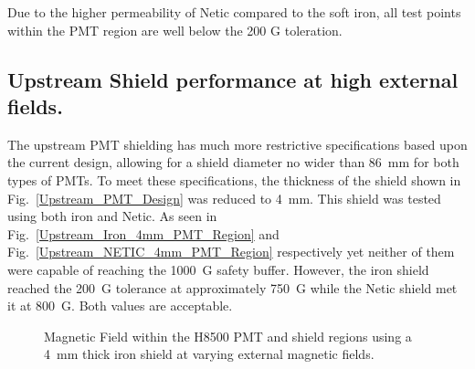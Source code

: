 \documentclass[12pt]{article}
\begin{document}
Due to the higher permeability of Netic compared to the soft iron, all test points 
within the PMT region are well below the 200 G toleration.


\subsection{Upstream Shield performance at high external  fields.}
The upstream PMT shielding has much more restrictive specifications based 
upon the current design, allowing for a shield diameter no wider than 86~mm for both types of PMTs.
To meet these specifications, the thickness of the shield shown in Fig.~\ref{Upstream_PMT_Design} 
was reduced to 4~mm.
This shield was tested using both iron and Netic. 
As seen in Fig.~\ref{Upstream_Iron_4mm_PMT_Region}  and Fig.~\ref{Upstream_NETIC_4mm_PMT_Region} 
respectively yet neither of them  were capable of reaching the 1000~G safety buffer. 
However, the iron shield reached the 200~G tolerance at approximately 
750~G while the Netic shield met it at 800~G. Both values are acceptable.
%
\begin{figure}[ht]
\centering
{}
\qquad
{}
\caption{\small{Magnetic Field within the H8500 PMT and shield regions using a 4~mm thick iron shield at varying external magnetic fields.}}\label{Upstream_Iron_4mm}
\end{figure}
\end{document}
